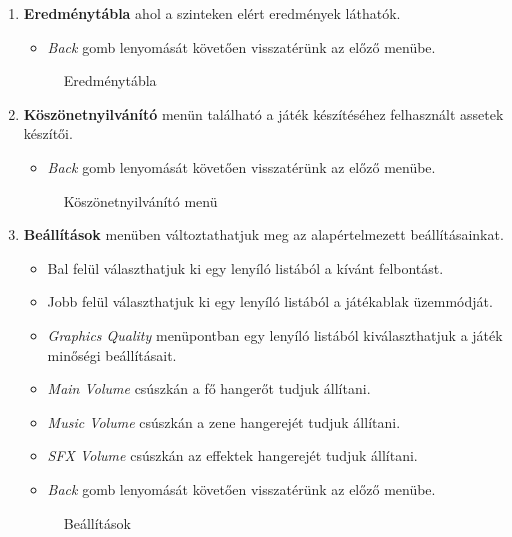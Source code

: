 \begin{enumerate}
	\item \label{scoreboard} \textbf{Eredménytábla} ahol a szinteken elért eredmények láthatók.
	\begin{itemize}
		\item \textit{Back} gomb lenyomását követően visszatérünk az előző menübe.
	\end{itemize}
	\begin{figure}[H]
		\noindent{}
		\caption{Eredménytábla}
		\label{scoreBoardF}
	\end{figure}
	
	\item \label{credit} \textbf{Köszönetnyilvánító} menün található a játék készítéséhez felhasznált assetek készítői.
	\begin{itemize}
		\item \textit{Back} gomb lenyomását követően visszatérünk az előző menübe.
	\end{itemize}
	\begin{figure}[H]
		\noindent{}
		\caption{Köszönetnyilvánító menü}
		\label{creditF}
	\end{figure}
	
	\item \label{setting} \textbf{Beállítások} menüben változtathatjuk meg az alapértelmezett beállításainkat.
	\begin{itemize}
		\item Bal felül választhatjuk ki egy lenyíló listából a kívánt felbontást.
		\item Jobb felül választhatjuk ki egy lenyíló listából a játékablak üzemmódját.
		\item \textit{Graphics Quality} menüpontban egy lenyíló listából kiválaszthatjuk a játék minőségi beállításait.
		\item \textit{Main Volume} csúszkán a fő hangerőt tudjuk állítani.
		\item \textit{Music Volume} csúszkán a zene hangerejét tudjuk állítani.
		\item \textit{SFX Volume} csúszkán az effektek hangerejét tudjuk állítani.
		\item \textit{Back} gomb lenyomását követően visszatérünk az előző menübe.
	\end{itemize}
	\begin{figure}[H]
		\noindent{}
		\caption{Beállítások}
		\label{settings}
	\end{figure}
	

\end{enumerate}
